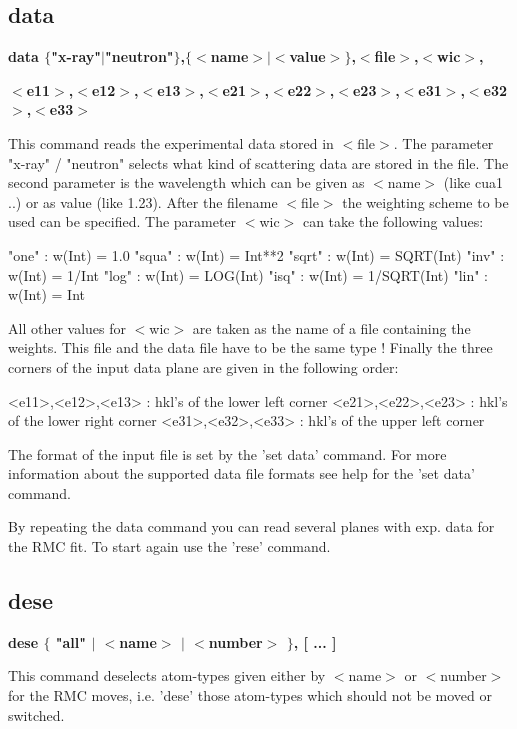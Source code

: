 \subsection*{data}
{\bf data $ \{$"x-ray"$| $"neutron"$\} $,$ \{$$ <$name$> $$| $$ <$value$> $$\} $,$ <$file$> $,$ <$wic$> $, \par }
{\bf      $ <$e11$> $,$ <$e12$> $,$ <$e13$> $,$ <$e21$> $,$ <$e22$> $,$ <$e23$> $,$ <$e31$> $,$ <$e32$> $,$ <$e33$> $ \par }
\par
\vspace{3pt}
This command reads the experimental data stored in $ <$file$> $. The parameter 
"x-ray" / "neutron" selects what kind of scattering data are stored 
in the file. The second parameter is the wavelength which can be given 
as $ <$name$> $ (like cua1 ..) or as value (like 1.23). After the filename 
$ <$file$> $ the weighting scheme to be used can be specified. The parameter 
$ <$wic$> $ can take the following values: 
\par
\begin{MacVerbatim}
  "one"  : w(Int) = 1.0                "squa" : w(Int) = Int**2
  "sqrt" : w(Int) = SQRT(Int)          "inv"  : w(Int) = 1/Int
  "log"  : w(Int) = LOG(Int)           "isq"  : w(Int) = 1/SQRT(Int)
  "lin"  : w(Int) = Int
\end{MacVerbatim}
All other values for $ <$wic$> $ are taken as the name of a file containing 
the weights. This file and the data file have to be the same type ! 
Finally the three corners of the input data plane are given in the 
following order: 
\par
\begin{MacVerbatim}
  <e11>,<e12>,<e13> : hkl's of the lower left corner
  <e21>,<e22>,<e23> : hkl's of the lower right corner
  <e31>,<e32>,<e33> : hkl's of the upper left corner
\end{MacVerbatim}
The format of the input file is set by the 'set data' command. For more 
information about the supported data file formats see help for the 
'set data' command. 
\par
By repeating the data command you can read several planes with exp. 
data for the RMC fit. To start again use the 'rese' command. 
\subsection*{dese}
{\bf dese $ \{$ "all" $| $ $ <$name$> $ $| $ $ <$number$> $ $\} $, [ ... ] \par }
\par
\vspace{3pt}
This command deselects atom-types given either by $ <$name$> $ or $ <$number$> $ 
for the RMC moves, i.e. 'dese' those atom-types which should not be 
moved or switched. 
